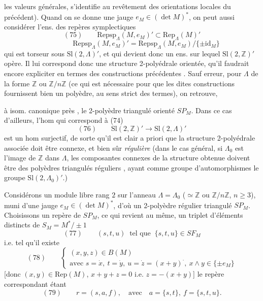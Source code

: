 \documentclass[11pt,a4paper]{article}
\begin{document}

les valeurs générales, s'identifie au revêtement des orientations locales du précédent). Quand on se donne une jauge $e_M \in (\det M)^{*}$, on peut aussi considérer l'ens. des repères symplectiques
\[
(75)\qquad \mathrm{Repsp}_\Lambda(M, e_M)' \subset \mathrm{Rep}_\Lambda(M)'
\]
\[
\qquad\qquad \mathrm{Repsp}_\Lambda(M, e_M)' = \mathrm{Repsp}_\Lambda(M, e_M)/\{\pm \mathrm{id}_M\}
\]
qui est torseur sous $\mathrm{Sl}(2,\Lambda)'$, et qui devient donc un ens. sur lequel $\mathrm{Sl}(2,\mathbb{Z})'$ opère. Il lui correspond donc une structure 2-polyédrale orientée, qu'il faudrait encore expliciter en termes des constructions précédentes . Sauf erreur, pour $\Lambda$ de la forme $\mathbb{Z}$ ou $\mathbb{Z}/n\mathbb{Z}$ (ce qui est nécessaire pour que les dites constructions fournissent bien un polyèdre, au sens strict des termes), on retrouve,

à isom. canonique près , le 2-polyèdre triangulé orienté $SP_M$. Dans ce cas d'ailleurs, l'hom qui correspond à (74)
\[
(76)\qquad \mathrm{Sl}(2,\mathbb{Z})' \longrightarrow \mathrm{Sl}(2,\Lambda)'
\]
est un hom surjectif, de sorte qu'il est clair a priori que la structure 2-polyédrale associée doit être connexe, et bien sûr \emph{régulière} (dans le cas général, si $\Lambda_0$ est l'image de $\mathbb{Z}$ dans $\Lambda$, les composantes connexes de la structure obtenue doivent être des polyèdres triangulés réguliers ,  \struck{\ill{}} ayant comme groupe d'automorphismes  le groupe $\mathrm{Sl}(2,\Lambda_0)'$.)



Considérons un module libre    rang $2$ sur l'anneau $\Lambda = \Lambda_0$ ($\simeq \mathbb{Z}$ ou $\mathbb{Z}/n\mathbb{Z}$, $n \geq 3$),  muni d'une jauge $e_M \in (\det M)^{*}$, d'où un 2-polyèdre régulier triangulé $SP_M$. Choisissons un repère  de $SP_M$,   ce qui revient au même, un triplet d'éléments distincts de $S_M = M^{*}/\pm 1$
\[
(77)\qquad (s,t,u) \ \text{ tel que } \ \{s,t,u\} \in SF_M
\]
i.e. tel qu'il existe
\[
(78)\qquad
\begin{cases}
(x,y,z) \in B(M) \\
\text{avec } s = \dot x, \ t = \dot y, \ u = \dot z = (x+y)^{\cdot}, \ x \wedge y \in \{\pm e_M\}
\end{cases}
\]
[donc $(x,y) \in \mathrm{Rep}(M)$, $x + y + z = 0$ i.e. $z = -(x+y)$]
le repère correspondant étant
\[
(79)\qquad r = (s, a, f), \quad \text{avec} \quad a = \{s,t\}, \ f = \{s,t,u\} .
\]
\end{document}
